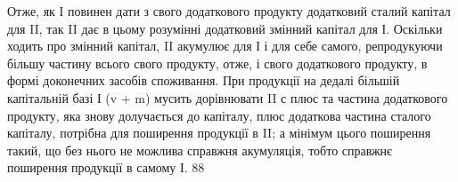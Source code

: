 Отже, як І повинен дати з свого додаткового продукту додатковий
сталий капітал для II, так II дає в цьому розумінні додатковий змінний
капітал для І. Оскільки ходить про змінний капітал, II акумулює для І і
для себе самого, репродукуючи більшу частину всього свого продукту,
отже, і свого додаткового продукту, в формі доконечних засобів споживання.
При продукції на дедалі більшій капітальній базі І (v + m) мусить
дорівнювати II с плюс та частина додаткового продукту, яка знову долучається
до капіталу, плюс додаткова частина сталого капіталу, потрібна
для поширення продукції в II; а мінімум цього поширення такий, що
без нього не можлива справжня акумуляція, тобто справжнє поширення
продукції в самому І.
88
